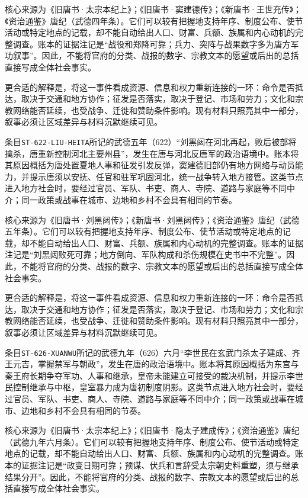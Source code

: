核心来源为《旧唐书·太宗本纪上》；《旧唐书·窦建德传》；《新唐书·王世充传》；《资治通鉴》唐纪（武德四年条）。它们可以较有把握地支持年序、制度公布、使节活动或特定地点的记载，却不能自动给出人口、财富、兵额、族属和内心动机的完整调查。账本的证据注记是“战役和郑降可靠；兵力、突阵与战果数字多为唐方军功叙事”。因此，不能将官府的分类、战报的数字、宗教文本的愿望或后出的总括直接写成全体社会事实。

更合适的解释是，将这一事件看成资源、信息和权力重新连接的一环：命令是否抵达，取决于交通和地方协作；征发是否落实，取决于登记、市场和劳力；文化和宗教网络能否延续，也受战争、迁徙和赞助条件影响。现有材料只照亮其中一部分，叙事必须让区域差异与材料沉默继续可见。

条目\texttt{ST-622-LIU-HEITA}所记的武德五年（622）“刘黑闼在河北再起，败后被部将擒杀，唐重新控制河北主要州县”，发生在唐与河北反唐军的政治语境中。账本将其原因概括为唐处置夏地人事和征发引发反弹，窦建德旧部仍有地方网络与动员能力，并提示唐须以安抚、任官和驻军巩固河北，统一战争转入地方接管。这类节点进入地方社会时，要经过官员、军队、书吏、商人、寺院、道路与家庭等不同中介；同一政策或战事在城市、边地和乡村不会具有相同的节奏。

核心来源为《旧唐书·刘黑闼传》；《新唐书·刘黑闼传》；《资治通鉴》唐纪（武德五年条）。它们可以较有把握地支持年序、制度公布、使节活动或特定地点的记载，却不能自动给出人口、财富、兵额、族属和内心动机的完整调查。账本的证据注记是“刘黑闼败死可靠；地方倒向、军队构成和杀伤规模在史书中不完整”。因此，不能将官府的分类、战报的数字、宗教文本的愿望或后出的总括直接写成全体社会事实。

更合适的解释是，将这一事件看成资源、信息和权力重新连接的一环：命令是否抵达，取决于交通和地方协作；征发是否落实，取决于登记、市场和劳力；文化和宗教网络能否延续，也受战争、迁徙和赞助条件影响。现有材料只照亮其中一部分，叙事必须让区域差异与材料沉默继续可见。

条目\texttt{ST-626-XUANWU}所记的武德九年（626）六月“李世民在玄武门杀太子建成、齐王元吉，掌握禁军与朝政”，发生在唐的政治语境中。账本将其原因概括为东宫与秦王府长期争夺军功、人事和继承，皇帝未能建立可接受的裁决机制，并提示李世民控制继承与中枢，皇室暴力成为唐初制度阴影。这类节点进入地方社会时，要经过官员、军队、书吏、商人、寺院、道路与家庭等不同中介；同一政策或战事在城市、边地和乡村不会具有相同的节奏。

核心来源为《旧唐书·太宗本纪上》；《旧唐书·隐太子建成传》；《资治通鉴》唐纪（武德九年六月条）。它们可以较有把握地支持年序、制度公布、使节活动或特定地点的记载，却不能自动给出人口、财富、兵额、族属和内心动机的完整调查。账本的证据注记是“政变日期可靠；预谋、伏兵和言辞受太宗朝史料重塑，须与继承结果分开”。因此，不能将官府的分类、战报的数字、宗教文本的愿望或后出的总括直接写成全体社会事实。

